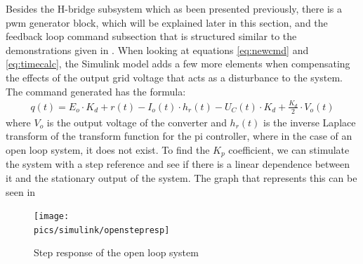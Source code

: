 Besides the \gls{H-bridge} subsystem which as been presented previously, there is a \gls{pwm} generator block, which will be explained later in this section, and the feedback loop command subsection that is structured similar to the demonstrations given in .
When looking at equations \eqref{eq:newcmd} and \eqref{eq:timecalc}, the Simulink model adds a few more elements when compensating the effects of the output grid voltage that acts as a disturbance to the system.
The command generated has the formula:
\begin{equation}
    \begin{split}
        q(t) = E_o \cdot K_d + r(t) - I_o(t) \cdot h_r(t) - U_C(t) \cdot K_d + \frac{K_d}{2} \cdot V_o(t)
    \end{split}
\end{equation}
where $V_o$ is the output voltage of the converter and $h_r(t)$ is the inverse Laplace transform of the transform function for the \gls{pi} controller, where in the case of an open loop system, it does not exist.
To find the $K_p$ coefficient, we can stimulate the system with a step reference and see if there is a linear dependence between it and the stationary output of the system.
The graph that represents this can be seen in 
\begin{figure}[!ht]
    \begin{center}\texttt{[image: \\pics/simulink/openstepresp]}\end{center}
    \caption{Step response of the open loop system}
    \label{fig:openstepresp}
\end{figure}

